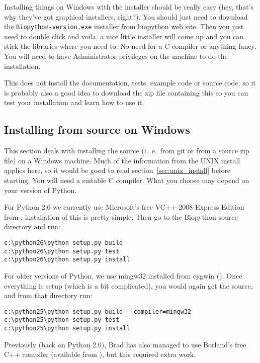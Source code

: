 \documentclass{article}
\begin{document}
Installing things on Windows with the installer should be really easy (hey, that's why they've got graphical installers, right?). You should just need to download the \verb|Biopython-version.exe| installer from biopython web site. Then you just need to double click and voila, a nice little installer will come up and you can stick the libraries where you need to. No need for a C compiler or anything fancy. You will need to have Administrator privileges on the machine to do the installation.

This does not install the documentation, tests, example code or source code, so it is probably also a good idea to download the zip file containing this so you can test your installation and learn how to use it.

\subsection{Installing from source on Windows}
\label{sec:windows_install}

This section deals with installing the source (i.~e.~from git or from a source zip file) on a Windows machine. Much of the information from the UNIX install applies here, so it would be good to read section~\ref{sec:unix_install} before starting.  You will need a suitable C compiler.
What you choose may depend on your version of Python.

For Python 2.6 we currently use Microsoft's free VC++ 2008 Express Edition from , installation of this is pretty simple.  Then go to the Biopython source directory and run:

\begin{verbatim}
c:\python26\python setup.py build
c:\python26\python setup.py test
c:\python26\python setup.py install
\end{verbatim}

For older versions of Python, we use mingw32 installed from cygwin ().  Once everything is setup (which is a bit complicated), you would again get the source, and from that directory run:

\begin{verbatim}
c:\python25\python setup.py build --compiler=mingw32
c:\python25\python setup.py test
c:\python25\python setup.py install
\end{verbatim}

Previously (back on Python 2.0), Brad has also managed to use Borland's free C++ compiler (available from ), but this required extra work.
\end{document}
